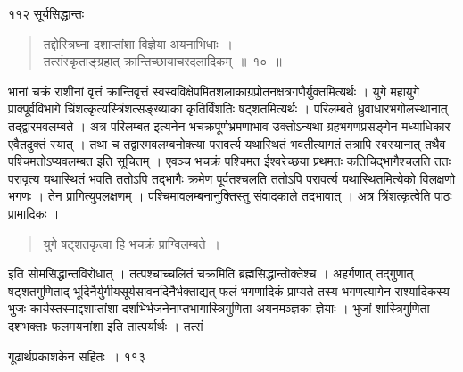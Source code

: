\documentclass[11pt, openany]{book}
\begin{document}
\noindent ११२ \hspace{4cm} सूर्यसिद्धान्तः 
\vspace{1cm}
\begin{quote}

  {\ssi तद्दोस्त्रिघ्ना दशाप्तांशा विज्ञेया अयनाभिधाः~।\\
 तत्संस्कृताङ्ग्रहात् क्रान्तिच्छायाचरदलादिकम्~॥~१०~॥}
\end{quote}
\begin{sloppypar}
 भानां चक्रं राशीनां वृत्तं क्रान्तिवृत्तं स्वस्वविक्षेपमितशलाकाग्रप्रोतनक्षत्रगणैर्युक्तमित्यर्थः । युगे महायुगे प्राक्पूर्वविभागे चिंशत्कृत्यस्त्रिंशत्सङ्ख्याका कृतिर्विंशतिः षट्शतमित्यर्थः । परिलम्बते ध्रुवाधारभगोलस्थानात् तद्द्वारमवलम्बते । अत्र परिलम्बत इत्यनेन भचक्रपूर्णभ्रमणाभाव उक्तोऽन्यथा ग्रहभगणप्रसङ्गेन मध्याधिकार एवैतदुक्तं स्यात् । तथा च तद्वारमवलम्बनोक्त्या परावर्त्य यथास्थितं भवतीत्यागतं तत्रापि स्वस्यानात् तथैव पश्चिमतोऽप्यवलम्बत इति सूचितम् । एवञ्च भचक्रं पश्चिमत ईश्वरेच्छया प्रथमतः कतिचिद्भागैश्चलति ततः परावृत्य यथास्थितं भवति ततोऽपि तद्भागैः क्रमेण पूर्वतश्चलति ततोऽपि परावर्त्य यथास्थितमित्येको विलक्षणो भगणः । तेन प्रागित्युपलक्षणम् । पश्चिमावलम्बनानुक्तिस्तु संवादकाले तदभावात् । अत्र त्रिंशत्कृत्वेति पाठः प्रामादिकः ।
\end{sloppypar}
\begin{quote}

 {\qt युगे षट्शतकृत्वा हि भचक्रं प्राग्विलम्बते~।}
\end{quote}
\begin{sloppypar}
 इति सोमसिद्धान्तविरोधात् । तत्पश्चाच्चलितं चक्रमिति ब्रह्मसिद्धान्तोक्तेश्च । अहर्गणात् तद्गुणात् षट्शतगुणिताद् भूदिनैर्युगीयसूर्यसावनदिनैर्भक्ताद्यत् फलं भगणादिकं प्राप्यते तस्य भगणत्यागेन राश्यादिकस्य भुजः कार्यस्तस्माद्दशाप्तांशा दशभिर्भजनेनाप्तभागास्त्रिगुणिता अयनमञ्ज्ञका ज्ञेयाः । भुजां शास्त्रिगुणिता दशभक्ताः फलमयनांशा इति तात्पर्यार्थः । तत्सं\textendash
\end{sloppypar}

\newpage



\hspace{3cm} गूढार्थप्रकाशकेन सहितः~। \hfill ११३
\vspace{1cm}
\end{document}
